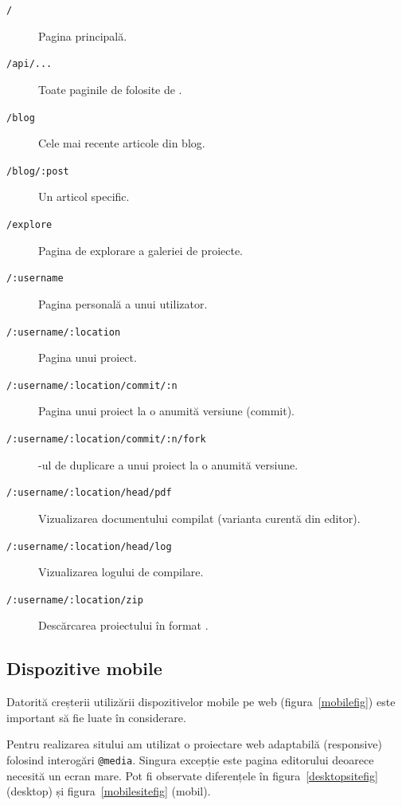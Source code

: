 \documentclass[a4wide,12pt]{report}
\newcommand{\eng}[1]{{#1}} %
\newcommand{\cod}[1]{\texttt{#1}}
\newcommand{\acr}[1]{{\textsmaller[1]{\textsc{#1}}}} %
\begin{document}
\begin{description}

\item[\cod{/}] Pagina principală.

\item[\cod{/api/...}] Toate paginile de folosite de \acr{API}.

\item[\cod{/blog}] Cele mai recente articole din blog.

\item[\cod{/blog/:post}] Un articol specific.

\item[\cod{/explore}] Pagina de explorare a galeriei de proiecte.

\item[\cod{/:username}] Pagina personală a unui utilizator.

\item[\cod{/:username/:location}] Pagina unui proiect.

\item[\cod{/:username/:location/commit/:n}] Pagina unui proiect la o anumită
versiune (\eng{commit}).

\item[\cod{/:username/:location/commit/:n/fork}] \acr{URL}-ul de duplicare a
unui proiect la o anumită versiune.

\item[\cod{/:username/:location/head/pdf}] Vizualizarea documentului compilat
(varianta curentă din editor).

\item[\cod{/:username/:location/head/log}] Vizualizarea logului de compilare.

\item[\cod{/:username/:location/zip}] Descărcarea proiectului în format \acr{ZIP}.

\end{description}

\subsection{Dispozitive mobile}

Datorită creșterii utilizării dispozitivelor mobile pe web
(figura~\ref{mobilefig}) este important să fie luate în considerare.

Pentru realizarea sitului am utilizat o proiectare web adaptabilă
(\eng{responsive}) folosind interogări \cod{@media}. Singura excepție este
pagina editorului deoarece necesită un ecran mare. Pot fi observate diferențele
în figura~\ref{desktopsitefig} (desktop) și figura~\ref{mobilesitefig} (mobil).
\end{document}
